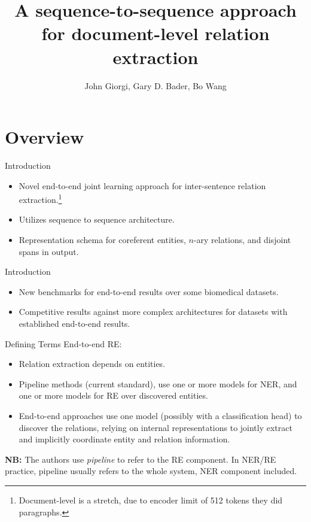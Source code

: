 \documentclass[usenames,dvipsnames,pdf]{beamer}
\title{A sequence-to-sequence approach for document-level relation extraction}
\author{John Giorgi, Gary D. Bader, Bo Wang}
\begin{document}
	\begin{frame}
		\titlepage
	\end{frame}


        \section{Overview}

        \begin{frame}{Introduction}
          \begin{itemize}
          \item
            Novel end-to-end joint learning approach for inter-sentence relation extraction.\footnote{Document-level is a stretch, due to encoder limit of 512 tokens they did paragraphs.}
          \item
            Utilizes sequence to sequence architecture.
          \item
            Representation schema for coreferent entities, $n$-ary relations, and disjoint spans in output.
          \end{itemize}
        \end{frame}

        \begin{frame}{Introduction}
          \begin{itemize}
          \item
            New benchmarks for end-to-end results over some biomedical datasets.
          \item
            Competitive results against more complex architectures for datasets with established end-to-end results.
          \end{itemize}
        \end{frame}

        \begin{frame}{Defining Terms}
          End-to-end RE:
          \begin{itemize}
          \item
            Relation extraction depends on entities.
          \item
            Pipeline methods (current standard), use one or more models for NER, and one or more models for RE over discovered entities.
          \item
            End-to-end approaches use one model (possibly with a classification head) to discover the relations,
            relying on internal representations to jointly extract and implicitly coordinate entity and relation information.
          \end{itemize}

          \textbf{NB:}  The authors use \textit{pipeline} to refer to the RE component.
          In NER/RE practice, pipeline usually refers to the whole system, NER component included.  
        \end{frame}
\end{document}
